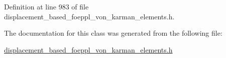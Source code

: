 Definition at line 983 of file displacement\+\_\+based\+\_\+foeppl\+\_\+von\+\_\+karman\+\_\+elements.\+h.



The documentation for this class was generated from the following file\+:\begin{DoxyCompactItemize}
\item 
\hyperlink{displacement__based__foeppl__von__karman__elements_8h}{displacement\+\_\+based\+\_\+foeppl\+\_\+von\+\_\+karman\+\_\+elements.\+h}\end{DoxyCompactItemize}
